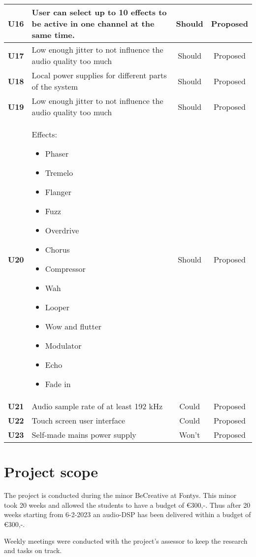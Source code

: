 \begin{longtable}{|c|p{10cm}|c|c|}
		\textbf{U16} & User can select up to 10 effects to be active in one channel at the same time. 								& Should & Proposed\\ \hline
		\textbf{U17} & Low enough jitter to not influence the audio quality too much 												& Should & Proposed\\ \hline
		\textbf{U18} & Local power supplies for different parts of the system 														& Should & Proposed\\ \hline
		\textbf{U19} & Low enough jitter to not influence the audio quality too much 												& Should & Proposed\\ \hline
		\textbf{U20} & Effects:\newline
		\begin{itemize}
			\setlength\itemsep{-0.3em}
			\item Phaser
			\item Tremelo
			\item Flanger
			\item Fuzz
			\item Overdrive
			\item Chorus
			\item Compressor
			\item Wah
			\item Looper
			\item Wow and flutter
			\item Modulator
			\item Echo
			\item Fade in
		\end{itemize}																												& Should & Proposed\\ \hline
		\textbf{U21} & Audio sample rate of at least 192 kHz 																		& Could  & Proposed\\ \hline
		\textbf{U22} & Touch screen user interface 																					& Could  & Proposed\\ \hline
		\textbf{U23} & Self-made mains power supply  																				& Won't  & Proposed\\ \hline
	\end{longtable}

\section{Project scope}

The project is conducted during the minor BeCreative at Fontys. This minor took 20 weeks and allowed the students to have a budget of €300,-. Thus after 20 weeks starting from 6-2-2023 an audio-DSP has been delivered within a budget of €300,-.
\par 
\noindent Weekly meetings were conducted with the project's assessor to keep the research and tasks on track.

